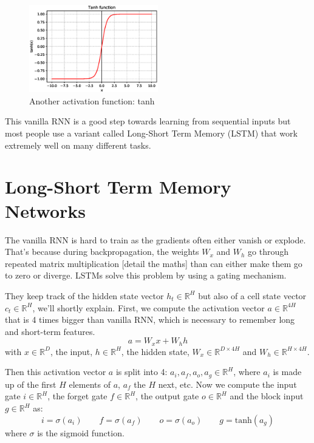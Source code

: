 \begin{figure}[H]
    \centering
    \includegraphics[width=0.5\textwidth]{Images/tanh.eps}
    \caption{Another activation function: tanh}
\end{figure}

This vanilla RNN is a good step towards learning from sequential inputs but most people use a variant called Long-Short Term Memory (LSTM) that work extremely well on many different tasks. 

\section{Long-Short Term Memory Networks}
The vanilla RNN is hard to train as the gradients often either vanish or explode. That's because during backpropagation, the weights $W_x$ and $W_h$ go through repeated matrix multiplication [detail the maths] than can either make them go to zero or diverge. LSTMs solve this problem by using a gating mechanism. 

They keep track of the hidden state vector $h_t \in \mathbb{R}^H$ but also of a cell state vector $c_t\in \mathbb{R}^H$, we'll shortly explain. First, we compute the activation vector $a \in \mathbb{R}^{4H}$ that is 4 times bigger than vanilla RNN, which is necessary to remember long and short-term features. 
\begin{equation}
a = W_x x + W_h h
\end{equation}
with $x \in \mathbb{R}^{D}$, the input, $h \in \mathbb{R}^{H}$, the hidden state, $W_x \in \mathbb{R}^{D\times 4H}$ and $W_h \in \mathbb{R}^{H\times 4H}$.

Then this activation vector $a$ is split into 4: $a_i, a_f, a_o, a_g \in \mathbb{R}^H$, where $a_i$ is made up of the first $H$ elements of $a$, $a_f$ the $H$ next, etc. Now we compute the input gate $i \in \mathbb{R}^H$, the forget gate $f \in \mathbb{R}^H$, the output gate $o \in \mathbb{R}^H$ and the block input $g \in \mathbb{R}^H$ as: 
\begin{equation}
    i = \sigma(a_i) \qquad f = \sigma(a_f) \qquad o = \sigma(a_o) \qquad g = \text{tanh}(a_g)
\end{equation}
where $\sigma$ is the sigmoid function.

